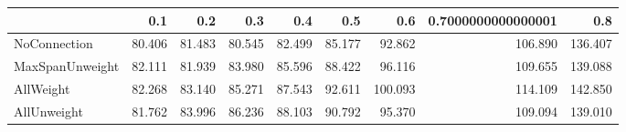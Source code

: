 \begin{tabular}{lrrrrrrrr}
\toprule
{} &    0.1 &    0.2 &    0.3 &    0.4 &    0.5 &     0.6 & 0.7000000000000001 &     0.8 \\
\midrule
NoConnection    & 80.406 & 81.483 & 80.545 & 82.499 & 85.177 &  92.862 &            106.890 & 136.407 \\
MaxSpanUnweight & 82.111 & 81.939 & 83.980 & 85.596 & 88.422 &  96.116 &            109.655 & 139.088 \\
AllWeight       & 82.268 & 83.140 & 85.271 & 87.543 & 92.611 & 100.093 &            114.109 & 142.850 \\
AllUnweight     & 81.762 & 83.996 & 86.236 & 88.103 & 90.792 &  95.370 &            109.094 & 139.010 \\
\bottomrule
\end{tabular}
